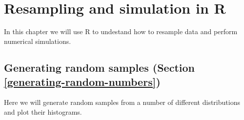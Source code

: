 \documentclass[12pt,]{book}
\begin{document}
\hypertarget{resampling-and-simulation-in-r}{%
\chapter{Resampling and simulation in R}\label{resampling-and-simulation-in-r}}

In this chapter we will use R to undestand how to resample data and perform numerical simulations.

\hypertarget{generating-random-samples-section-refgenerating-random-numbers}{%
\section{Generating random samples (Section \ref{generating-random-numbers})}\label{generating-random-samples-section-refgenerating-random-numbers}}

Here we will generate random samples from a number of different distributions and plot their histograms.
\end{document}
